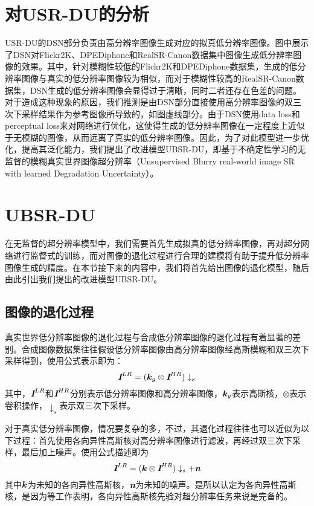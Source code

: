 \section{对USR-DU的分析}
USR-DU的DSN部分负责由高分辨率图像生成对应的拟真低分辨率图像。图中展示了DSN对Flickr2K\parencite{timofte2017ntire}、DPEDiphone\parencite{ignatov2017dslr}和RealSR-Canon数据集中图像生成低分辨率图像的效果。其中，针对模糊性较低的Flickr2K和DPEDiphone数据集，生成的低分辨率图像与真实的低分辨率图像较为相似，而对于模糊性较高的RealSR-Canon数据集，DSN生成的低分辨率图像会显得过于清晰，同时二者还存在色差的问题。对于造成这种现象的原因，我们推测是由DSN部分直接使用高分辨率图像的双三次下采样结果作为参考图像所导致的，如图虚线部分。由于DSN使用data loss和perceptual loss来对网络进行优化，这使得生成的低分辨率图像在一定程度上近似于无模糊的图像，从而远离了真实的低分辨率图像。因此，为了对此模型进一步优化，提高其泛化能力，我们提出了改进模型UBSR-DU，即基于不确定性学习的无监督的模糊真实世界图像超分辨率（Unsupervised Blurry real-world image SR with learned Degradation Uncertainty）。
\section{UBSR-DU}
在无监督的超分辨率模型中，我们需要首先生成拟真的低分辨率图像，再对超分网络进行监督式的训练，而对图像的退化过程进行合理的建模将有助于提升低分辨率图像生成的精度。在本节接下来的内容中，我们将首先给出图像的退化模型，随后由此引出我们提出的改进模型UBSR-DU。
\subsection{图像的退化过程}
真实世界低分辨率图像的退化过程与合成低分辨率图像的退化过程有着显著的差别。合成图像数据集往往假设低分辨率图像由高分辨率图像经高斯模糊和双三次下采样得到，使用公式表示即为：
\begin{equation}
    \textbf{\em I}^{LR}=(\vb*{k}_g\otimes \textbf{\em I}^{HR})\downarrow_s
\end{equation}
其中，$\textbf{\em I}^{LR}$和$\textbf{\em I}^{HR}$分别表示低分辨率图像和高分辨率图像，$\vb*{k}_g$表示高斯核，$\otimes$表示卷积操作，$\downarrow_s$表示双三次下采样。

对于真实低分辨率图像，情况要复杂的多，不过，其退化过程往往也可以近似为以下过程：首先使用各向异性高斯核对高分辨率图像进行滤波，再经过双三次下采样，最后加上噪声。使用公式描述即为
\begin{equation}
    \textbf{\em I}^{LR}=(\vb*{k}\otimes \textbf{\em I}^{HR})\downarrow_s+\textbf{\em n}
\end{equation}
其中$\vb*{k}$为未知的各向异性高斯核，$\textbf{\em n}$为未知的噪声。是所以认定为各向异性高斯核，是因为等工作表明，各向异性高斯核先验对超分辨率任务来说是完备的。

